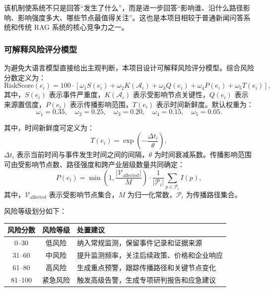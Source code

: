\documentclass[12pt,a4paper]{article}
\begin{document}
该机制使系统不只是回答“发生了什么”，而是进一步回答“影响谁、沿什么路径影响、影响强度多大、哪些节点最值得关注”。这也是本项目相较于普通新闻问答系统和传统 RAG 系统的核心竞争力之一。

\subsubsection{可解释风险评分模型}

为避免大语言模型直接给出主观判断，本项目设计可解释风险评分模型。综合风险分数定义为：
\begin{equation}
\text{RiskScore}(e_i)=100 \cdot
\left[
\omega_1 S(e_i)
+
\omega_2 K(\mathcal{A}_i)
+
\omega_3 Q(e_i)
+
\omega_4 P(e_i)
+
\omega_5 T(e_i)
\right],
\end{equation}
其中，$S(e_i)$ 表示事件严重度，$K(\mathcal{A}_i)$ 表示受影响节点关键性，$Q(e_i)$ 表示来源置信度，$P(e_i)$ 表示传播影响范围，$T(e_i)$ 表示时间新鲜度。默认权重为：
\begin{equation}
\omega_1=0.35,\quad
\omega_2=0.25,\quad
\omega_3=0.20,\quad
\omega_4=0.15,\quad
\omega_5=0.05.
\end{equation}

其中，时间新鲜度可定义为：
\begin{equation}
T(e_i)=\exp\left(-\frac{\Delta t_i}{\theta}\right),
\end{equation}
$\Delta t_i$ 表示当前时间与事件发生时间之间的间隔，$\theta$ 为时间衰减系数。传播影响范围可由受影响节点数、路径强度和跨产业层级数量共同确定：
\begin{equation}
P(e_i)=
\min\left(
1,
\frac{|\mathcal{V}_{\text{affected}}|}{M}
\right)
\cdot
\frac{1}{|\mathcal{P}_i|}
\sum_{p \in \mathcal{P}_i} I(p),
\end{equation}
其中，$\mathcal{V}_{\text{affected}}$ 表示受影响节点集合，$M$ 为归一化常数，$\mathcal{P}_i$ 为传播路径集合。

风险等级划分如下：
\begin{center}
\begin{tabularx}{0.9\linewidth}{c c >{\raggedright\arraybackslash}X}
\toprule
风险分数 & 风险等级 & 处置建议 \\
\midrule
0--30 & 低风险 & 纳入常规监测，保留事件记录和证据来源 \\
31--60 & 中风险 & 提升监测频率，关注后续政策、价格和企业响应 \\
61--80 & 高风险 & 生成重点预警，跟踪传播路径和关键节点变化 \\
81--100 & 紧急风险 & 触发高级告警，生成专项研判报告和应急建议 \\
\bottomrule
\end{tabularx}
\end{center}
\end{document}
